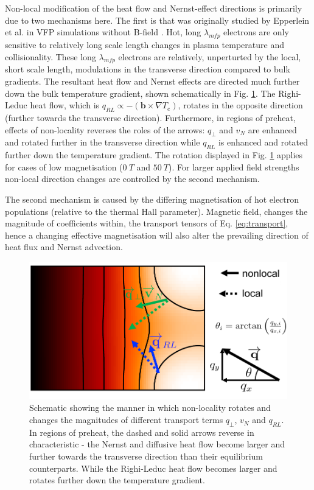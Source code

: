 \documentclass[aip,reprint]{revtex4-1}
\begin{document}
Non-local modification of the heat flow and Nernst-effect  directions is primarily due to two mechanisms here. The first is that was originally studied by Epperlein et al. in VFP simulations without B-field \cite{Epperlein1988}. Hot, long $\lambda_{mfp}$ electrons are only sensitive to relatively long scale length changes in plasma temperature and collisionality. These long $\lambda_{mfp}$ electrons are relatively, unperturted by the local, short scale length, modulations in the transverse direction compared to bulk gradients. The resultant heat flow and Nernst effects are directed much further down the bulk temperature gradient,  shown schematically in Fig. \ref{fig:heat_flow_rotation}. The Righi-Leduc heat flow, which is $q_{RL} \propto -(\mathbf{b} \times \nabla T_e)$,   rotates in the opposite direction (further towards the transverse direction). Furthermore, in regions of preheat, effects of non-locality reverses the roles of the arrows: $q_{\perp}$ and $v_N$ are enhanced and rotated further in the transverse direction while $q_{RL}$ is enhanced and rotated further down the temperature gradient. The rotation displayed in Fig. \ref{fig:heat_flow_rotation} applies for cases of low magnetisation ($\SI{0}{T}$ and $\SI{50}{T}$). For larger applied field strengths non-local direction changes are controlled by the second mechanism.

The second mechanism is caused by the differing magnetisation of hot electron populations (relative to the thermal Hall parameter). Magnetic field, changes the magnitude of coefficients within, the transport tensors of Eq. \ref{eq:transport}, hence a changing effective magnetisation will also alter the prevailing direction of heat flux and Nernst advection.

\begin{figure}
	\includegraphics[width=1.0\columnwidth]{pics/heatflow_angle_schematic.pdf}
	\caption{\label{fig:heat_flow_rotation} Schematic showing the manner in which non-locality rotates and changes the magnitudes of different transport terms $q_{\perp}$, $v_N$ and $q_{RL}$. In regions of preheat, the dashed and solid arrows reverse in characteristic - the Nernst and diffusive heat flow become larger and further towards the transverse direction than their equilibrium counterparts. While the Righi-Leduc heat flow becomes larger and rotates further down the temperature gradient. }
\end{figure}
\end{document}
